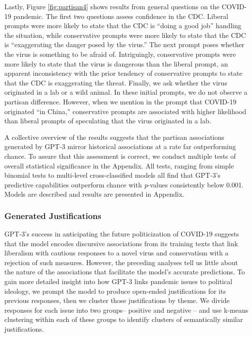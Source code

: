 \documentclass{article}
\begin{document}
Lastly, Figure \ref{fig:partisan4} shows results from general questions on the COVID-19
pandemic. The first two questions assess confidence in the CDC. Liberal
prompts were more likely to state that the CDC is ``doing a good job''
handling the situation, while conservative prompts were more likely to
state that the CDC is ``exaggerating the danger posed by the virus.''
The next prompt poses whether the virus is something to be afraid of.
Intriguingly, conservative prompts were more likely to state that the
virus is dangerous than the liberal prompt, an apparent inconsistency
with the prior tendency of conservative prompts to state that the CDC is
exaggerating the threat. Finally, we ask whether the virus originated in
a lab or a wild animal. In these initial prompts, we do not observe a
partisan difference. However, when we mention in the prompt that
COVID-19 originated ``in China,'' conservative prompts are associated
with higher likelihood than liberal prompts of speculating that the
virus originated in a lab.

A collective overview of the results suggests that the partisan
associations generated by GPT-3 mirror historical associations at a rate
far outperforming chance. To assure that this assessment is correct, we
conduct multiple tests of overall statistical significance in the
Appendix. All tests, ranging from simple binomial tests to multi-level
cross-classified models all find that GPT-3's predictive capabilities
outperform chance with \emph{p}-values consistently below 0.001. Models
are described and results are presented in Appendix.

\subsubsection*{Generated Justifications}

GPT-3's success in anticipating the future politicization of COVID-19
suggests that the model encodes discursive associations from its
training texts that link liberalism with cautious responses to a novel
virus and conservatism with a rejection of such measures. However, the
preceding analyses tell us little about the nature of the associations
that facilitate the model's accurate predictions. To gain more detailed
insight into how GPT-3 links pandemic issues to political ideology, we
prompt the model to produce open-ended justifications for its previous
responses, then we cluster those justifications by theme. We divide
responses for each issue into two groups-- positive and negative -- and
use k-means clustering within each of these groups to identify clusters
of semantically similar justifications.
\end{document}
